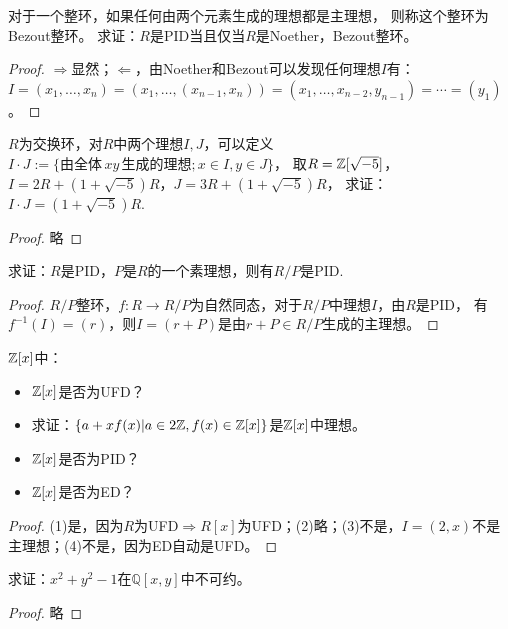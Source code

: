 \begin{exercise}
    对于一个整环，如果任何由两个元素生成的理想都是主理想，
    则称这个整环为Bezout整环。
    求证：$R$是PID当且仅当$R$是Noether，Bezout整环。
\end{exercise}
\begin{proof}
    $\Longrightarrow$显然；$\Longleftarrow$，由Noether和Bezout可以发现任何理想$I$有：
    $I=(x_1,\ldots,x_n)=(x_1,\ldots,(x_{n-1},x_n))=(x_1,\ldots,x_{n-2},y_{n-1})=\cdots=(y_1)$。
\end{proof}

\begin{exercise}
    $R$为交换环，对$R$中两个理想$I,J$，可以定义$I\cdot J:=\{由全体\,xy\,生成的理想;x\in I,y\in J\}$，
    取$R=\mathbb{Z}[\sqrt{-5}]$，$I=2R+(1+\sqrt{-5})R$，$J=3R+(1+\sqrt{-5})R$，
    求证：$I\cdot J=(1+\sqrt{-5})R$.
\end{exercise}
\begin{proof}
    略
\end{proof}

\begin{exercise}
    求证：$R$是PID，$P$是$R$的一个素理想，则有$R/P$是PID.
\end{exercise}
\begin{proof}
    $R/P$整环，$f:R\to R/P$为自然同态，对于$R/P$中理想$I$，由$R$是PID，
    有$f^{-1}(I)=(r)$，则$I=(r+P)$是由$r+P\in R/P$生成的主理想。
\end{proof}

\begin{exercise}
    $\mathbb{Z}[x]$中：
    \begin{itemize}
        \item[(1)]$\mathbb{Z}[x]$是否为UFD？
        \item[(2)]求证：$\{a+xf(x)|a\in2\mathbb{Z},f(x)\in\mathbb{Z}[x]\}$是$\mathbb{Z}[x]$中理想。
        \item[(3)]$\mathbb{Z}[x]$是否为PID？
        \item[(4)]$\mathbb{Z}[x]$是否为ED？
    \end{itemize}
\end{exercise}
\begin{proof}
   (1)是，因为$R$为UFD$\Rightarrow R[x]$为UFD；(2)略；(3)不是，$I=(2,x)$不是主理想；(4)不是，因为ED自动是UFD。
\end{proof}

\begin{exercise}
    求证：$x^2+y^2-1$在$\mathbb{Q}[x,y]$中不可约。
\end{exercise}
\begin{proof}
    略
\end{proof}

